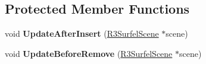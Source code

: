 \subsection*{Protected Member Functions}
\begin{DoxyCompactItemize}
\item 
void {\bfseries Update\+After\+Insert} (\hyperlink{class_r3_surfel_scene}{R3\+Surfel\+Scene} $\ast$scene)\hypertarget{class_r3_surfel_label_assignment_aa99120b98cba0f5a8653cefe63c23bc6}{}\label{class_r3_surfel_label_assignment_aa99120b98cba0f5a8653cefe63c23bc6}

\item 
void {\bfseries Update\+Before\+Remove} (\hyperlink{class_r3_surfel_scene}{R3\+Surfel\+Scene} $\ast$scene)\hypertarget{class_r3_surfel_label_assignment_a946a3e605e9d8b9ed4d80406f02178fa}{}\label{class_r3_surfel_label_assignment_a946a3e605e9d8b9ed4d80406f02178fa}

\end{DoxyCompactItemize}
